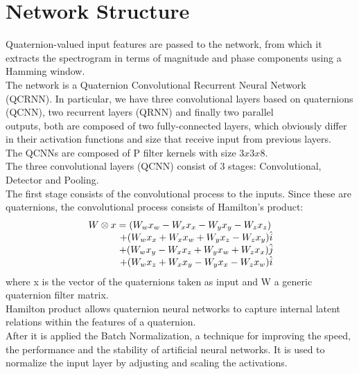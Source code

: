 \documentclass{article}
\begin{document}
    \section{Network Structure}
    Quaternion-valued input features are passed to the network, from which it extracts the spectrogram in terms of magnitude and phase components 
    using a Hamming window.
    \\ The network is a Quaternion Convolutional Recurrent Neural Network (QCRNN).
    In particular, we have three convolutional layers based on quaternions (QCNN), two recurrent layers (QRNN) and finally two parallel 
    \\ outputs, both are composed of two fully-connected layers, which obviously differ in their activation functions and size that 
    receive input from previous layers.
    \\ The QCNNs are composed of P filter kernels with size $3x3x8$. 
    \\ The three convolutional layers (QCNN) consist of 3 stages: Convolutional, Detector and  Pooling.
    \\ The first stage consists of the convolutional process to the inputs. Since these are quaternions, the convolutional process 
    consists of Hamilton's product:
    \begin{equation*}
        \begin{matrix}
            W \otimes x =(W_wx_w - W_xx_x - W_yx_y - W_zx_z ) \\
               \hspace{1.2cm} + (W_wx_x + W_xx_w + W_yx_z - W_zx_y )\hat{i} \\
               \hspace{1.2cm} + (W_wx_y - W_xx_z + W_yx_w + W_zx_x )\hat{j} \\
               \hspace{1.2cm} + (W_wx_z + W_xx_y - W_yx_x - W_zx_w )\hat{i}
        \end{matrix}
    \end{equation*}
    where x is the vector of the quaternions taken as input and W a generic quaternion filter matrix.
    \\ Hamilton product allows quaternion neural networks to capture internal latent relations within the features of a quaternion.
    \\ After it is applied the Batch Normalization, a technique for improving the speed, the performance  and the stability of artificial 
    neural networks. It is used to normalize the input layer by adjusting and scaling the activations.
\end{document}
